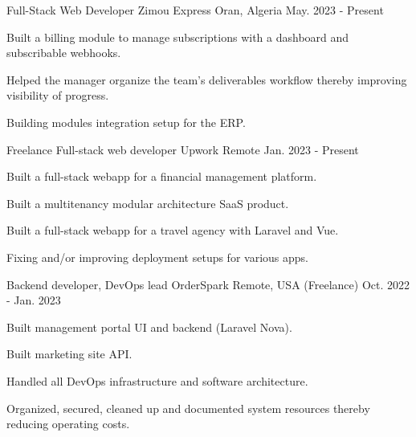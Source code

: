 

\begin{cventries}
  \cventry
    {Full-Stack Web Developer} %
    {Zimou Express} %
    {Oran, Algeria} %
    {May. 2023 - Present} %
    {
      \begin{cvitems} %
        \item {Built a billing module to manage subscriptions with a dashboard and subscribable webhooks.}
        \item {Helped the manager organize the team's deliverables workflow thereby improving visibility of progress.}
        \item {Building modules integration setup for the ERP.}
      \end{cvitems}
    }

  \cventry
    {Freelance Full-stack web developer} %
    {Upwork} %
    {Remote} %
    {Jan. 2023 - Present} %
    {
      \begin{cvitems} %
        \item {Built a full-stack webapp for a financial management platform.}
        \item {Built a multitenancy modular architecture SaaS product.}
        \item {Built a full-stack webapp for a travel agency with Laravel and Vue.}
        \item {Fixing and/or improving deployment setups for various apps.}
      \end{cvitems}
    }

  \cventry
    {Backend developer, DevOps lead} %
    {OrderSpark} %
    {Remote, USA (Freelance)} %
    {Oct. 2022 - Jan. 2023} %
    {
      \begin{cvitems} %
        \item {Built management portal UI and backend (Laravel Nova).}
        \item {Built marketing site API.}
        \item {Handled all DevOps infrastructure and software architecture.}
        \item {Organized, secured, cleaned up and documented system resources thereby reducing operating costs.}
      \end{cvitems}
    }


\end{cventries}
